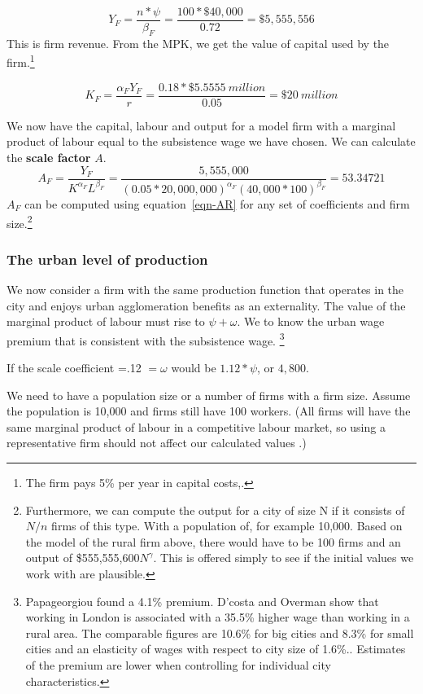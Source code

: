 \[Y_F=\frac{n*\psi}{\beta_F}=\frac{100*\$40,000}{0.72}=\$5,555,556\]
This is firm revenue. From the MPK, we get the value of capital used by the firm.\footnote{The firm pays 5\% per year in capital costs,.} 

\[K_F=  \frac{\alpha_F Y_F }{r}=\frac{0.18 *\$5.5555\ million}{0.05} =\$20\ million \]

We now have the capital, labour and output for a model firm with a marginal product of labour  equal to the subsistence wage we have chosen. We can calculate the \textbf{scale factor} $A$.
{\color{red}
\begin{equation}  
A_F= \frac{Y_F}{K^{\alpha_F} L^{\beta_F}}=\frac{5,555,000}
{(0.05*20,000,000)^{\alpha_F} (40,000*100)^{\beta_F}} =53.34721 \label{eqn-AR}\end{equation} 
}
%
$A_F$ can be computed using equation~\ref{eqn-AR} for any set of coefficients and firm size.\footnote{Furthermore, we can compute the output for a city of size N if it consists of $N/n$ firms of this type. With a population of, for example 10,000. Based on the model of the rural firm above,   there would have to be  100 firms and an output of \$555,555,600$N^\gamma$. This is offered simply to see if the initial values we work with are plausible.}


\color{orange}
 \subsubsection{The urban level of production}
We now consider a firm with the same production function that operates in the city and enjoys  urban agglomeration benefits as an externality. The value of the  marginal product of labour must rise to $\psi+\omega$. We to know  the urban wage premium that is consistent with the subsistence wage. \footnote{Papageorgiou \cite{papageorgiouOccupationalMatchingCities2022} found a 4.1\% premium. D'costa and Overman   show that working in London is associated with a 35.5\% higher wage than working in a rural area. The comparable figures are 10.6\% for big cities and 8.3\% for small cities and an elasticity of wages with respect to city size of 1.6\%.. Estimates of the premium are lower  when controlling for individual city characteristics.}   

If the scale coefficient =.12 $=\omega$ would be $1.12*\psi$, or $4,800$.

We need to have a population size or a number of firms with a firm size. Assume the population is 10,000 and firms still have 100 workers. (All firms will have the same marginal product of labour in a competitive labour market, so using a representative firm should not affect our calculated values .)

